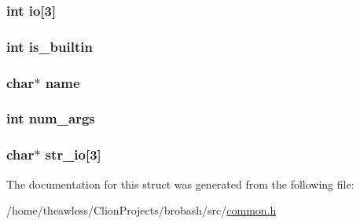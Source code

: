 \subsubsection[{\texorpdfstring{io}{io}}]{\setlength{\rightskip}{0pt plus 5cm}int io\mbox{[}3\mbox{]}}\hypertarget{structsimple__command_a5fc7b270e96f791a5dfc2d6fc660746f}{}\label{structsimple__command_a5fc7b270e96f791a5dfc2d6fc660746f}
\subsubsection[{\texorpdfstring{is\+\_\+builtin}{is_builtin}}]{\setlength{\rightskip}{0pt plus 5cm}int is\+\_\+builtin}\hypertarget{structsimple__command_a911dcab49b8e851dbaea397e4484a899}{}\label{structsimple__command_a911dcab49b8e851dbaea397e4484a899}
\subsubsection[{\texorpdfstring{name}{name}}]{\setlength{\rightskip}{0pt plus 5cm}char$\ast$ name}\hypertarget{structsimple__command_a5ac083a645d964373f022d03df4849c8}{}\label{structsimple__command_a5ac083a645d964373f022d03df4849c8}
\subsubsection[{\texorpdfstring{num\+\_\+args}{num_args}}]{\setlength{\rightskip}{0pt plus 5cm}int num\+\_\+args}\hypertarget{structsimple__command_ac4e44ff521d44260ba0133a28b2b9a79}{}\label{structsimple__command_ac4e44ff521d44260ba0133a28b2b9a79}
\subsubsection[{\texorpdfstring{str\+\_\+io}{str_io}}]{\setlength{\rightskip}{0pt plus 5cm}char$\ast$ str\+\_\+io\mbox{[}3\mbox{]}}\hypertarget{structsimple__command_addb37712c399c7c94b8a7ec8cf392d39}{}\label{structsimple__command_addb37712c399c7c94b8a7ec8cf392d39}


The documentation for this struct was generated from the following file\+:\begin{DoxyCompactItemize}
\item 
/home/theawless/\+Clion\+Projects/brobash/src/\hyperlink{common_8h}{common.\+h}\end{DoxyCompactItemize}
